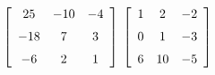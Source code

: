 {$\left[ \begin {array}{ccc} 25&-10&-4\\\noalign{\medskip}-18&7&3
\\\noalign{\medskip}-6&2&1\end {array} \right]$
 }
{$\left[ \begin {array}{ccc} 1&2&-2\\\noalign{\medskip}0&1&-3
\\\noalign{\medskip}6&10&-5\end {array} \right] $}
